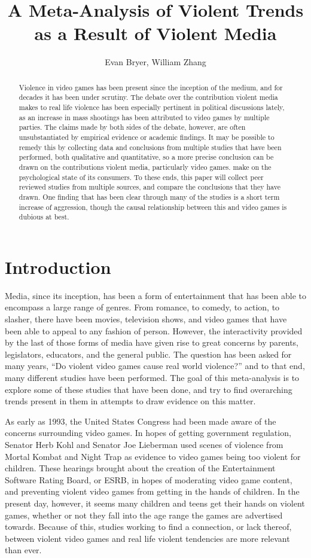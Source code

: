 \documentclass[11pt]{article}
\title{A Meta-Analysis of Violent Trends as a Result of Violent Media}
\author{Evan Bryer, William Zhang}
\date{}
\begin{document}
\nocite{*}
\maketitle
\begin{abstract}
Violence in video games has been present since the inception of the medium, and for decades it has been under scrutiny. The debate over the contribution violent media makes to real life violence has been especially pertinent in political discussions lately, as an increase in mass shootings has been attributed to video games by multiple parties. The claims made by both sides of the debate, however, are often unsubstantiated by empirical evidence or academic findings. It may be possible to remedy this by collecting data and conclusions from multiple studies that have been performed, both qualitative and quantitative, so a more precise conclusion can be drawn on the contributions violent media, particularly video games. make on the psychological state of its consumers. To these ends, this paper will collect peer reviewed studies from multiple sources, and compare the conclusions that they have drawn. One finding that has been clear through many of the studies is a short term increase of aggression, though the causal relationship between this and video games is dubious at best.
\end{abstract}
\section{Introduction}

Media, since its inception, has been a form of entertainment that has been able to encompass a large range of genres. From romance, to comedy, to action, to slasher, there have been movies, television shows, and video games that have been able to appeal to any fashion of person. However, the interactivity provided by the last of those forms of media have given rise to great concerns by parents, legislators, educators, and the general public. The question has been asked for many years, “Do violent video games cause real world violence?” and to that end, many different studies have been performed. The goal of this meta-analysis is to explore some of these studies that have been done, and try to find overarching trends present in them in attempts to draw evidence on this matter. 

As early as 1993, the United States Congress had been made aware of the concerns surrounding video games. In hopes of getting government regulation, Senator Herb Kohl and Senator Joe Lieberman used scenes of violence from Mortal Kombat and Night Trap as evidence to video games being too violent for children. These hearings brought about the creation of the Entertainment Software Rating Board, or ESRB, in hopes of moderating video game content, and preventing violent video games from getting in the hands of children. In the present day, however, it seems many children and teens get their hands on violent games, whether or not they fall into the age range the games are advertised towards. Because of this, studies working to find a connection, or lack thereof, between violent video games and real life violent tendencies are more relevant than ever.
\end{document}
